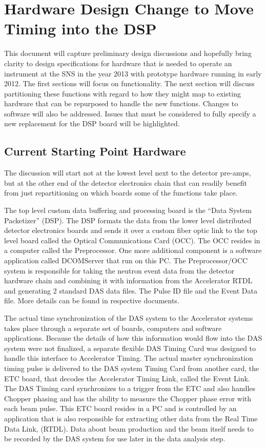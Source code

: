 \section{Hardware Design Change to Move Timing into the DSP}
This document will capture preliminary design discussions and hopefully bring clarity to design specifications for hardware that is needed to operate an instrument at the SNS in the year 2013 with prototype hardware running in early 2012. 
The first sections will focus on functionality.  The next section will discuss partitioning these functions with regard to how they might map to existing hardware that can be repurposed to handle the new functions.  Changes to software will also be addressed.   Issues that must be considered to fully specify a new replacement for the DSP board will be highlighted.

\subsection{Current Starting Point Hardware}
The discussion will start not at the lowest level next to the detector pre-amps, but at the other end of the detector electronics chain that can readily benefit from just repartitioning on which boards some of the functions take place.  

The top level custom data buffering and processing board is the ``Data System Packetizer'' (DSP).   The DSP formats the data from the lower level distributed detector electronics boards and sends it over a custom fiber optic link to the top level board called the Optical Communications Card (OCC).  The OCC resides in a computer called the Preprocessor.  One more additional component is a software application called DCOMServer that run on this PC.  The Preprocessor/OCC system is responsible for taking the neutron event data from the detector hardware chain and combining it with information from the Accelerator RTDL and generating  2 standard DAS data files.  The Pulse ID file and the Event Data file.  More details can be found in respective documents.

The actual time synchronization of the DAS system to the Accelerator systems takes place through a separate set of boards, computers and software applications.  Because the details of how this information would flow into the DAS system were not finalized, a separate flexible DAS Timing Card was designed to handle this interface to Accelerator Timing.    The actual master synchronization timing pulse is delivered to the DAS system Timing Card from another card, the ETC board,  that decodes the Accelerator Timing Link, called the Event Link.  The DAS Timing card synchronizes to a trigger from the ETC and also handles Chopper phasing and has the ability to measure the Chopper phase error with each beam pulse.  This ETC board resides in a PC and is controlled by an application that is also responsible for extracting other data from the Real Time Data Link, (RTDL).   Data about beam production and the beam itself needs to be recorded by the DAS system for use later in the data analysis step.

